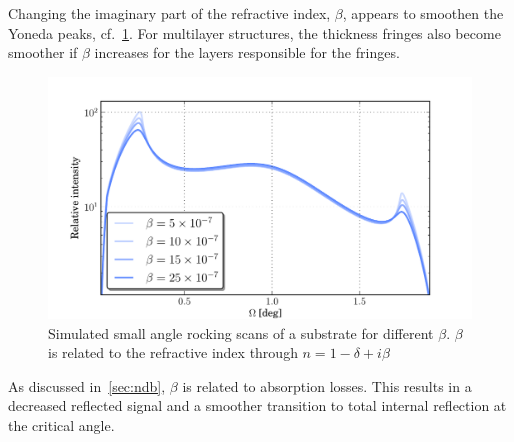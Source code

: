 \documentclass[10pt,twoside, b5paper,pdftex]{report}
\begin{document}
Changing the imaginary part of the refractive index, $\beta$, appears to smoothen the Yoneda peaks, cf.~\cref{fig:var_beta}. For multilayer structures, the thickness fringes also become smoother if $\beta$ increases for the layers responsible for the fringes.  
\begin{figure}[htbp]
	\begin{center}
		\includegraphics[width=1.0\textwidth]{figures/var_beta.pdf}
	\end{center}
	\caption{Simulated small angle rocking scans of a substrate for different $\beta$. $\beta$ is related to the refractive index through $n = 1 - \delta + i\beta$ \label{fig:var_beta}}
\end{figure}
As discussed in~\cref{sec:ndb}, $\beta$ is related to absorption losses.%
This results in a decreased reflected signal and a smoother transition to total internal reflection at the critical angle.
\end{document}
